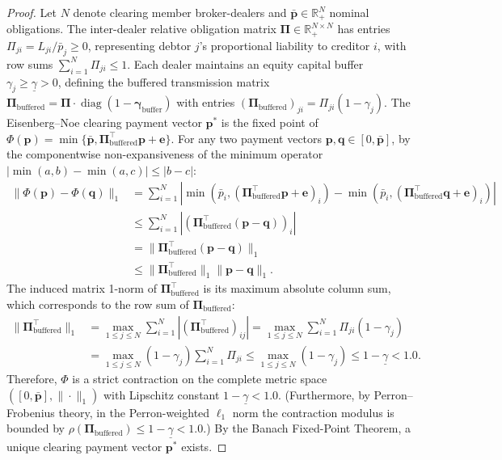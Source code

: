 \documentclass[11pt,a4paper]{article}
\theoremstyle{definition}\newtheorem{definition}[theorem]{Definition}
\theoremstyle{remark}\newtheorem{remark}[theorem]{Remark}
\begin{document}
\begin{proof}
Let $N$ denote clearing member broker-dealers and $\bar{\mathbf{p}} \in \mathbb{R}_+^N$ nominal obligations. The inter-dealer relative obligation matrix $\mathbf{\Pi} \in \mathbb{R}_+^{N \times N}$ has entries $\Pi_{ji} = L_{ji} / \bar{p}_j \ge 0$, representing debtor $j$'s proportional liability to creditor $i$, with row sums $\sum_{i=1}^N \Pi_{ji} \le 1$.
Each dealer maintains an equity capital buffer $\gamma_j \ge \underline{\gamma} > 0$, defining the buffered transmission matrix $\mathbf{\Pi}_{\text{buffered}} = \mathbf{\Pi} \cdot \operatorname{diag}(1 - \boldsymbol{\gamma}_{\text{buffer}})$ with entries $(\mathbf{\Pi}_{\text{buffered}})_{ji} = \Pi_{ji} (1 - \gamma_j)$.
The Eisenberg--Noe clearing payment vector $\mathbf{p}^*$ is the fixed point of $\Phi(\mathbf{p}) = \min\{\bar{\mathbf{p}}, \mathbf{\Pi}_{\text{buffered}}^\top \mathbf{p} + \mathbf{e}\}$.
For any two payment vectors $\mathbf{p}, \mathbf{q} \in [0, \bar{\mathbf{p}}]$, by the componentwise non-expansiveness of the minimum operator $|\min(a, b) - \min(a, c)| \le |b - c|$:
\begin{align}
\|\Phi(\mathbf{p}) - \Phi(\mathbf{q})\|_1 &= \sum_{i=1}^N \left| \min(\bar{p}_i, (\mathbf{\Pi}_{\text{buffered}}^\top \mathbf{p} + \mathbf{e})_i) - \min(\bar{p}_i, (\mathbf{\Pi}_{\text{buffered}}^\top \mathbf{q} + \mathbf{e})_i) \right| \nonumber\\
&\le \sum_{i=1}^N \left| (\mathbf{\Pi}_{\text{buffered}}^\top (\mathbf{p} - \mathbf{q}))_i \right| \nonumber\\
&= \|\mathbf{\Pi}_{\text{buffered}}^\top (\mathbf{p} - \mathbf{q})\|_1 \nonumber\\
&\le \|\mathbf{\Pi}_{\text{buffered}}^\top\|_1 \|\mathbf{p} - \mathbf{q}\|_1.
\end{align}
The induced matrix 1-norm of $\mathbf{\Pi}_{\text{buffered}}^\top$ is its maximum absolute column sum, which corresponds to the row sum of $\mathbf{\Pi}_{\text{buffered}}$:
\begin{align}
\|\mathbf{\Pi}_{\text{buffered}}^\top\|_1 &= \max_{1 \le j \le N} \sum_{i=1}^N |(\mathbf{\Pi}_{\text{buffered}}^\top)_{ij}| = \max_{1 \le j \le N} \sum_{i=1}^N \Pi_{ji}(1 - \gamma_j) \nonumber\\
&= \max_{1 \le j \le N} (1 - \gamma_j) \sum_{i=1}^N \Pi_{ji} \le \max_{1 \le j \le N} (1 - \gamma_j) \le 1 - \underline{\gamma} < 1.0.
\end{align}
Therefore, $\Phi$ is a strict contraction on the complete metric space $([0, \bar{\mathbf{p}}], \|\cdot\|_1)$ with Lipschitz constant $1 - \underline{\gamma} < 1.0$. (Furthermore, by Perron--Frobenius theory, in the Perron-weighted $\ell_1$ norm the contraction modulus is bounded by $\rho(\mathbf{\Pi}_{\text{buffered}}) \le 1 - \underline{\gamma} < 1.0$.) By the Banach Fixed-Point Theorem, a unique clearing payment vector $\mathbf{p}^*$ exists.

\end{proof}
\end{document}
